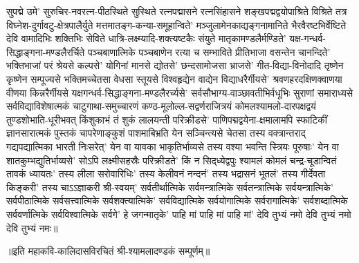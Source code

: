 सुपद्मे उमे'
सुरुचिर-नवरत्न-पीठस्थिते सुस्थिते
रत्नपद्मासने रत्नसिंहासने
शङ्खपद्मद्वयोपाश्रिते विश्रिते
तत्र विघ्नेश-दुर्गावटु-क्षेत्रपालैर्युते
मत्तमातङ्ग-कन्या-समूहान्विते'
मञ्जुलामेनकाद्यङ्गनामानिते
भैरवैरष्टभिर्वेष्टिते देवि
वामादिभिः शक्तिभिः सेविते
धात्रि-लक्ष्म्यादि-शक्त्यष्टकैः संयुते
मातृकामण्डलैर्मण्डिते'
यक्ष-गन्धर्व-सिद्धाङ्गना-मण्डलैरर्चिते
पञ्चबाणात्मिके पञ्चबाणेन रत्या च सम्भाविते
प्रीतिभाजा वसन्तेन चानन्दिते'
भक्तिभाजां परं श्रेयसे कल्पसे'
योगिनां मानसे द्योतसे'
छन्दसामोजसा भ्राजसे'
गीत-विद्या-विनोदादि तृष्णेन कृष्णेन सम्पूज्यसे
भक्तिमच्चेतसा वेधसा स्तूयसे
विश्वहृद्येन वाद्येन विद्याधरैर्गीयसे'
श्रवणहरदक्षिणक्वाणया वीणया
किन्नरैर्गीयसे यक्षगन्धर्व-सिद्धाङ्गना-मण्डलैरर्च्यसे'
सर्वसौभाग्य-वाञ्छावतीभिर्वधूभिः
सुराणां समाराध्यसे सर्वविद्याविशेषात्मकं
चाटुगाथा-समुच्चारणं कण्ठ-मूलोल्ल-सद्वर्णराजित्रयं कोमलश्यामलो-दारपक्षद्वयं तुण्डशोभाति-धूरीभवत्
किंशुकाभं तं शुकं लालयन्ती परिक्रीडसे'
पाणिपद्मद्वयेना-क्षमालामपि स्फाटिकीं
ज्ञानसारात्मकं पुस्तकं चापरेणाङ्कुशं
पाशमाबिभ्रति येन सञ्चिन्त्यसे चेतसा तस्य वक्त्रान्तराद् गद्यपद्यात्मिका भारती निःसरेत्' येन वा यावका भाकृतिर्भाव्यसे
तस्य  वश्या भवन्ति स्त्रियः पूरुषाः'
येन वा शातकुम्भद्युतिर्भाव्यसे'
सोऽपि लक्ष्मीसहस्रैः परिक्रीडते'
किं न सिद्‌ध्येद्वपुः श्यामलं कोमलं
चन्द्र-चूडान्वितं तावकं ध्यायतः'
तस्य लीला सरोवारिधिः'
तस्य केलीवनं नन्दनं'
तस्य भद्रासनं भूतलं'
तस्य गीर्देवता किङ्करी'
तस्य चाऽऽज्ञाकरी श्री-स्वयम्'
सर्वतीर्थात्मिके सर्वमन्त्रात्मिके सर्वतन्त्रात्मिके सर्वयन्त्रात्मिके'
सर्वपीठात्मिके सर्वसत्त्वात्मिके सर्वशक्त्यात्मिके'
सर्वविद्यात्मिके सर्वयोगात्मिके सर्वरागात्मिके'
सर्वशब्दात्मिके सर्ववर्णात्मिके सर्वविश्वात्मिके सर्वगे'
हे जगन्मातृके' पाहि मां पाहि मां पाहि मां'
देवि तुभ्यं नमो देवि तुभ्यं नमो देवि तुभ्यं नमः॥

\centerline{॥इति महाकवि-कालिदासविरचितं श्री-श्यामलादण्डकं सम्पूर्णम्॥}